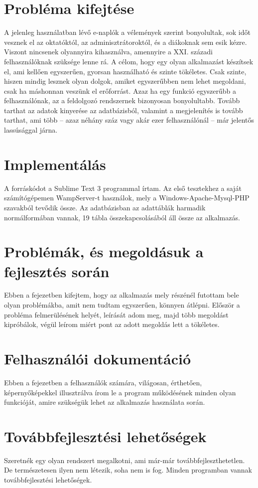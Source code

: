 \documentclass[
]{thesis-ekf}
\begin{document}
\chapter{Probléma kifejtése}
A jelenleg használatban lévő e-naplók a vélemények szerint bonyolultak, sok időt vesznek el az oktatóktól, az adminisztrátoroktól, és a diákoknak sem esik kézre. Viszont nincsenek olyannyira kihasználva, amennyire a XXI. századi felhasználóknak szüksége lenne rá. A célom, hogy egy olyan alkalmazást készítsek el, ami kellően egyszerűen, gyorsan használható és szinte tökéletes. Csak szinte, hiszen mindig lesznek olyan dolgok, amiket egyszerűbben nem lehet megoldani, csak ha máshonnan veszünk el erőforrást. Azaz ha egy funkció egyszerűbb a felhasználónak, az a feldolgozó rendszernek bizonyosan bonyolultabb. Tovább tarthat az adatok kinyerése az adatbázisból, valamint a megjelenítés is tovább tarthat, ami több -- azaz néhány száz vagy akár ezer felhasználónál -- már jelentős lassúsággal járna.
\chapter{Implementálás}
A forráskódot a Sublime Text 3 programmal írtam. Az első tesztekhez a saját számítógépemen WampServer-t használok, mely a Windows-Apache-Mysql-PHP szavakból tevődik össze. Az adatbázisban az adattáblák harmadik normálformában vannak, 19 tábla összekapcsolásából áll össze az alkalmazás.
\chapter{Problémák, és megoldásuk a fejlesztés során}
Ebben a fejezetben kifejtem, hogy az alkalmazás mely részénél futottam bele olyan problémákba, amit nem tudtam egyszerűen, könnyen átlépni. Először a probléma felmerülésének helyét, leírását adom meg, majd több megoldást kipróbálok, végül leírom miért pont az adott megoldás lett a tökéletes.
\chapter{Felhasználói dokumentáció}
Ebben a fejezetben a felhasználók számára, világosan, érthetően, képernyőképekkel illusztrálva írom le a program működésének minden olyan funkcióját, amire szükségük lehet az alkalmazás használata során.
\chapter{Továbbfejlesztési lehetőségek}
Szeretnék egy olyan rendszert megalkotni, ami már-már továbbfejleszthetetlen. De természetesen ilyen nem létezik, soha nem is fog. Minden programban vannak továbbfejlesztési lehetőségek.
\end{document}
